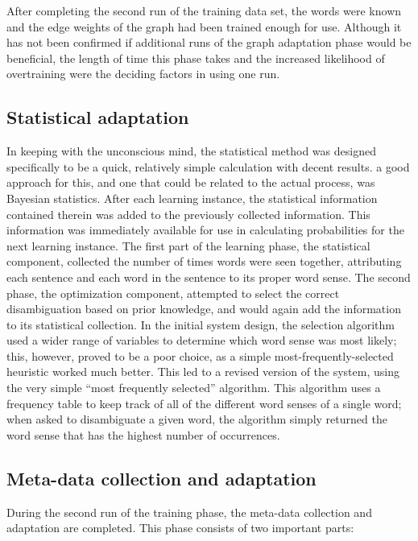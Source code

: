 After completing the second run of the training data set, the words were known and
the edge weights of the graph had been trained enough for use.  Although it has
not been confirmed if additional runs of the graph adaptation phase would be
beneficial, the length of time this phase takes and the increased likelihood
of overtraining were the deciding factors in using one run.

\subsection{Statistical adaptation}

In keeping with the unconscious mind, the statistical method was designed
specifically to be a quick, relatively simple calculation with decent results.
a good approach for this, and one that could be related to the actual
process, was Bayesian statistics.  After each learning instance, the statistical
information contained therein was added to the previously collected
information.  This information was immediately available for use in calculating
probabilities for the next learning instance.  The first part of the learning
phase, the statistical component, collected the number of times words were seen
together, attributing each sentence and each word in the sentence to its proper
word sense.  The second
phase, the optimization component, attempted to select
the correct disambiguation based on prior knowledge, and would again add the
information to its statistical collection.  In the initial system design, the selection algorithm 
used a wider range of variables to determine which word sense was most likely;
this, however, proved to be a poor choice, as a simple most-frequently-selected heuristic worked much better.  
This led to a revised version of the system, using the very simple
``most frequently selected'' algorithm.  This algorithm
uses a frequency table to keep track of all of the different word senses of a
single word; when asked to disambiguate a given word, the algorithm simply returned the
word sense that has the highest number of occurrences.

\subsection{Meta-data collection and adaptation}

During the second run of the training phase, the meta-data collection 
and adaptation are completed.  This phase consists of two important
parts: 

